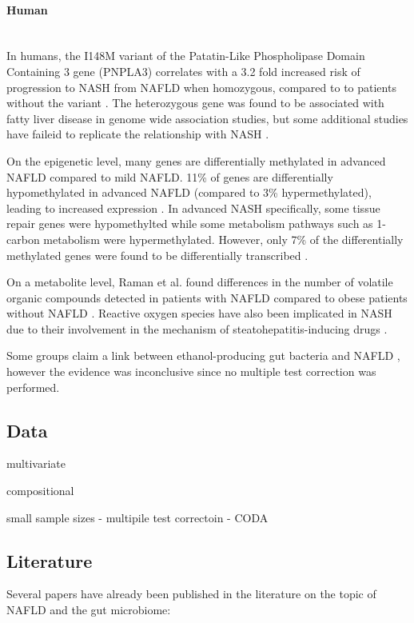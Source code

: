 \paragraph{Human}\mbox{}\\
In humans, the I148M variant of the Patatin-Like Phospholipase Domain Containing 3 gene (PNPLA3) correlates with a 3.2 fold increased risk of progression to NASH from NAFLD when homozygous, compared to to patients without the variant \cite{sookoian2011meta}. The heterozygous gene was found to be associated with fatty liver disease in genome wide association studies, but some additional studies have faileid to replicate the relationship with NASH \cite{sookoian2011meta}.

On the epigenetic level, many genes are differentially methylated in advanced NAFLD compared to mild NAFLD. 11\% of genes are differentially hypomethylated in advanced NAFLD (compared to 3\% hypermethylated), leading to increased expression \cite{murphy2013relationship}. In advanced NASH specifically, some tissue repair genes were hypomethylted while some metabolism pathways such as 1-carbon metabolism were hypermethylated. However, only 7\% of the differentially methylated genes were found to be differentially transcribed \cite{murphy2013relationship}.

On a metabolite level, Raman et al. found differences in the number of volatile organic compounds detected in patients with NAFLD compared to obese patients without NAFLD \cite{raman2013fecal}. Reactive oxygen species have also been implicated in NASH due to their involvement in the mechanism of steatohepatitis-inducing drugs \cite{berson1998steatohepatitis}.

Some groups claim a link between ethanol-producing gut bacteria and NAFLD \cite{zhu2013characterization} \cite{jiang2015dysbiosis}, however the evidence was inconclusive since no multiple test correction was performed.

\subsection{Data}

multivariate

compositional

small sample sizes
- multipile test correctoin
- CODA

\subsection{Literature}
Several papers have already been published in the literature on the topic of NAFLD and the gut microbiome:

